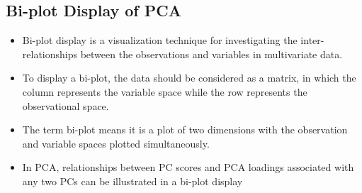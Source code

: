 \documentclass[a4paper,12pt]{article}
\begin{document}
	
	\subsection{Bi-plot Display of PCA}
	\begin{itemize}
		\item Bi-plot display is a visualization technique for investigating
		the inter-relationships between the observations and
		variables in multivariate data.
		\item  To display a bi-plot, the data should be considered as a
		matrix, in which the column represents the variable space
		while the row represents the observational space.
		\item  The term bi-plot means it is a plot of two dimensions with the
		observation and variable spaces plotted simultaneously.
		\item  In PCA, relationships between PC scores and PCA loadings
		associated with any two PCs can be illustrated in a bi-plot
		display
	\end{itemize}
	
	
\end{document}
